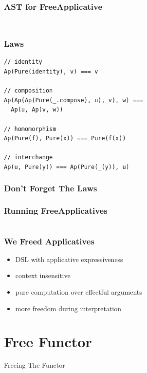 \documentclass{beamer}
\begin{document}
\begin{frame}[fragile]
  \frametitle{AST for FreeApplicative}
    \inputminted{scala}{snippets/free-applicative.scala}
  \begin{verbatim}
\end{verbatim}
\end{frame}

\begin{frame}[fragile]
  \frametitle{Laws}
\begin{verbatim}
// identity
Ap(Pure(identity), v) === v

// composition
Ap(Ap(Ap(Pure(_.compose), u), v), w) ===
  Ap(u, Ap(v, w))

// homomorphism
Ap(Pure(f), Pure(x)) === Pure(f(x))

// interchange
Ap(u, Pure(y)) === Ap(Pure(_(y)), u)
\end{verbatim}
\end{frame}

\begin{frame}
  \frametitle{Don't Forget The Laws}
\end{frame}

\begin{frame}
  \frametitle{Running FreeApplicatives}
  \inputminted{scala}{snippets/freeap-interp.scala}
\end{frame}

\begin{frame}
  \frametitle{We Freed Applicatives}
  \begin{itemize}
  \item DSL with applicative expressiveness
  \item context insensitive
  \item pure computation over effectful arguments
  \item more freedom during interpretation
  \end{itemize}
\end{frame}

\section{Free Functor}\label{sec:free-functor}
\begin{frame}
  \begin{center}
    \Huge
    Freeing The Functor
  \end{center}
\end{frame}
\end{document}
